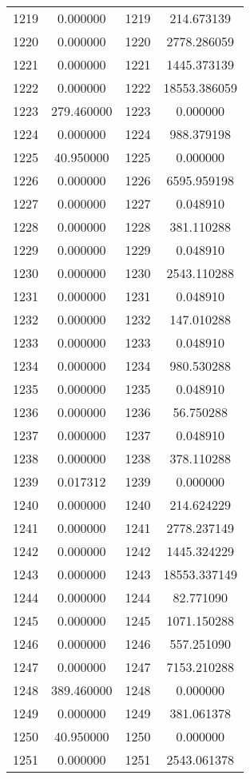 \documentclass[12pt]{article}
\begin{document}
\begin{longtable}{@{}cccc@{}}
1219 & 0.000000 & 1219 & 214.673139 \\
1220 & 0.000000 & 1220 & 2778.286059 \\
1221 & 0.000000 & 1221 & 1445.373139 \\
1222 & 0.000000 & 1222 & 18553.386059 \\
1223 & 279.460000 & 1223 & 0.000000 \\
1224 & 0.000000 & 1224 & 988.379198 \\
1225 & 40.950000 & 1225 & 0.000000 \\
1226 & 0.000000 & 1226 & 6595.959198 \\
1227 & 0.000000 & 1227 & 0.048910 \\
1228 & 0.000000 & 1228 & 381.110288 \\
1229 & 0.000000 & 1229 & 0.048910 \\
1230 & 0.000000 & 1230 & 2543.110288 \\
1231 & 0.000000 & 1231 & 0.048910 \\
1232 & 0.000000 & 1232 & 147.010288 \\
1233 & 0.000000 & 1233 & 0.048910 \\
1234 & 0.000000 & 1234 & 980.530288 \\
1235 & 0.000000 & 1235 & 0.048910 \\
1236 & 0.000000 & 1236 & 56.750288 \\
1237 & 0.000000 & 1237 & 0.048910 \\
1238 & 0.000000 & 1238 & 378.110288 \\
1239 & 0.017312 & 1239 & 0.000000 \\
1240 & 0.000000 & 1240 & 214.624229 \\
1241 & 0.000000 & 1241 & 2778.237149 \\
1242 & 0.000000 & 1242 & 1445.324229 \\
1243 & 0.000000 & 1243 & 18553.337149 \\
1244 & 0.000000 & 1244 & 82.771090 \\
1245 & 0.000000 & 1245 & 1071.150288 \\
1246 & 0.000000 & 1246 & 557.251090 \\
1247 & 0.000000 & 1247 & 7153.210288 \\
1248 & 389.460000 & 1248 & 0.000000 \\
1249 & 0.000000 & 1249 & 381.061378 \\
1250 & 40.950000 & 1250 & 0.000000 \\
1251 & 0.000000 & 1251 & 2543.061378 \\

\end{longtable}
\end{document}
